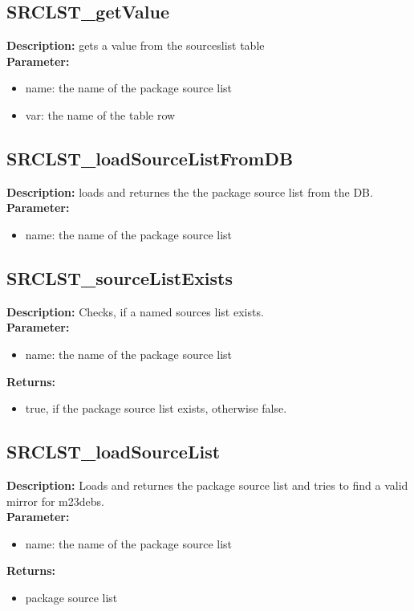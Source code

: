 \subsection{SRCLST\_getValue}
\textbf{Description:} gets a value from the sourceslist table\\
\textbf{Parameter:}
\begin{itemize}
\item name: the name of the package source list
\item var: the name of the table row
\end{itemize}

\subsection{SRCLST\_loadSourceListFromDB}
\textbf{Description:} loads and returnes the the package source list from the DB.\\
\textbf{Parameter:}
\begin{itemize}
\item name: the name of the package source list
\end{itemize}

\subsection{SRCLST\_sourceListExists}
\textbf{Description:} Checks, if a named sources list exists.\\
\textbf{Parameter:}
\begin{itemize}
\item name: the name of the package source list
\end{itemize}
\textbf{Returns:}
\begin{itemize}
\item true, if the package source list exists, otherwise false.
\end{itemize}

\subsection{SRCLST\_loadSourceList}
\textbf{Description:} Loads and returnes the package source list and tries to find a valid mirror for m23debs.\\
\textbf{Parameter:}
\begin{itemize}
\item name: the name of the package source list
\end{itemize}
\textbf{Returns:}
\begin{itemize}
\item package source list
\end{itemize}

